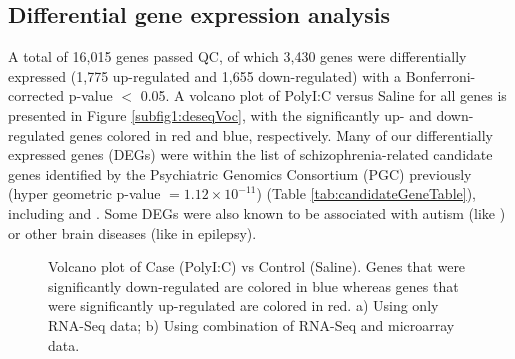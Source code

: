 \subsection{Differential gene expression analysis}
A total of 16,015 genes passed QC, of which 3,430 genes were differentially expressed (1,775 up-regulated and 1,655 down-regulated) with a Bonferroni-corrected p-value $<$ 0.05. 
A volcano plot of PolyI:C versus Saline for all genes is presented in Figure \ref{subfig1:deseqVoc}, with the significantly up- and down-regulated genes colored in red and blue, respectively. 
Many of our differentially expressed genes (DEGs) were within the list of schizophrenia-related candidate genes identified by the Psychiatric Genomics Consortium (PGC)\cite{Greenwood2011} previously (hyper geometric p-value $= 1.12\times 10^{-11}$) (Table \ref{tab:candidateGeneTable}), including \cite{Balan2013} and \cite{Morris2003}.
Some DEGs were also known to be associated with autism (like \cite{Fatemi2009}) or other brain diseases (like  in epilepsy\cite{Conti2015}).
\begin{figure}[!h]
	\centering     
	\caption{Volcano plot of Case (PolyI:C) vs Control (Saline). 
		Genes that were significantly down-regulated are colored in blue whereas genes that were significantly up-regulated are colored in red. 
		a) Using only RNA-Seq data; 
		b) Using combination of RNA-Seq and microarray data.
	}
\end{figure}



